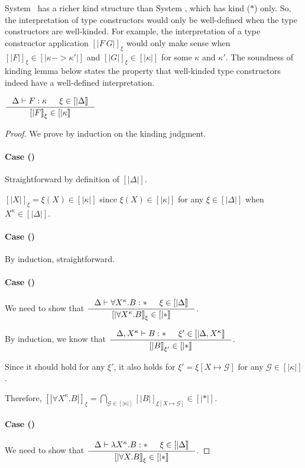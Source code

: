 System \Fw\ has a richer kind structure than System \F, which has kind ($*$)
only. So, the interpretation of type constructors would only be well-defined
when the type constructors are well-kinded. For example, the interpretation of
a type constructor application $[|F~G|]_\xi$ would only make sense
when $[|F|]_\xi\in[|\kappa -> \kappa'|]$ and
$[|G|]_\xi\in[|\kappa|]$ for some $\kappa$ and $\kappa'$.
The soundness of kinding lemma below states the property that
well-kinded type constructors indeed have a well-defined interpretation.
\begin{lemma}  \label{lem:fw:soundki}
$ \inference{\Delta |- F : \kappa & \xi\in[|\Delta|]}{[|F|]_\xi\in[|\kappa|]} $
\end{lemma}
\begin{proof}
We prove by induction on the kinding judgment.
\paragraph{Case ()}
Straightforward by definition of $[|\Delta|]$.

$[|X|]_\xi=\xi(X) \in [|\kappa|]$
since $\xi(X)\in[|\kappa|]$ for any $\xi\in[|\Delta|]$
when $X^\kappa \in [|\Delta|]$.

\paragraph{Case ()} By induction, straightforward.

\paragraph{Case ()}
We need to show that
$ \inference{\Delta |- \forall X^\kappa.B:* & \xi\in[|\Delta|]}
        {[|\forall X^\kappa.B|]_\xi\in[|*|]} $.

By induction, we know that
$ \inference{\Delta,X^\kappa |- B:* & \xi'\in[|\Delta,X^\kappa|]}
        {[|B|]_{\xi'} \in [|*|]} $.

Since it should hold for any $\xi'$, it also holds for
$\xi'=\xi[X\mapsto\mathcal{G}]$ for any $\mathcal{G}\in[|\kappa|]$.

Therefore,
$  [|\forall X^\kappa.B|]_\xi
 = \bigcap_{\mathcal{G}\in[|\kappa|]}[|B|]_{\xi[X\mapsto\mathcal{G}]}\in[|*|] $.

\paragraph{Case ()}
We need to show that
$ \inference{\Delta |- \l X^\kappa.B:* & \xi\in[|\Delta|]}
        {[|\forall X.B|]_\xi\in[|*|]} $.


\end{proof}
